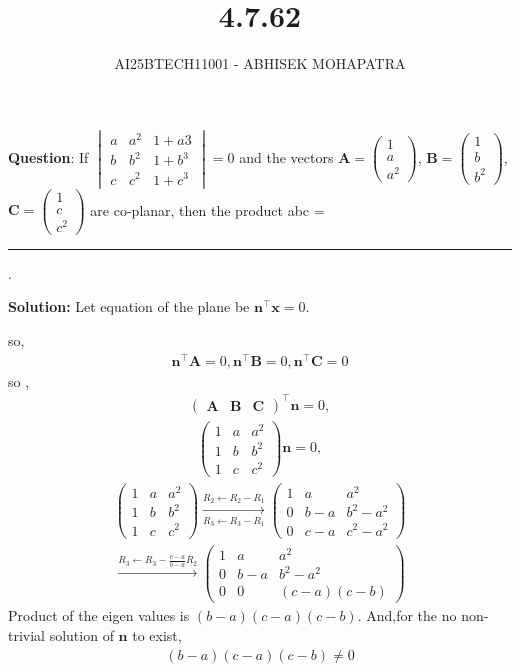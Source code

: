 \documentclass{beamer}
\title{4.7.62}
\author{AI25BTECH11001 - ABHISEK MOHAPATRA}
\theoremstyle{remark}
\newcommand{\myvec}[1]{\ensuremath{\begin{pmatrix}#1\end{pmatrix}}}
\newcommand{\mydet}[1]{\ensuremath{\begin{vmatrix}#1\end{vmatrix}}}
\let\vec\mathbf
\numberwithin{equation}{section}
\begin{document}
{\let\newpage\relax\maketitle}
\renewcommand{\thefigure}{\theenumi}
\renewcommand{\thetable}{\theenumi}



	 	\textbf{Question}:
If $\mydet{a &a^2 &1+ a3\\ b & b^2 & 1 + b^3\\c & c^2 & 1 + c^3} = 0$
and the vectors $\vec{A}=\myvec{1\\a\\a^2}$, $\vec{B}=\myvec{1\\b\\b^2}$, $\vec{C}=\myvec{1\\c\\c^2}$ are co-planar, then the product
abc = \rule{1cm}{0.15mm}.
		

		\textbf{Solution:} 
Let equation of the plane be $\vec{n}^\top\vec{x}=0$.

so, 
\begin{align}
\vec{n}^\top\vec{A}=0,
\vec{n}^\top\vec{B}=0,
\vec{n}^\top\vec{C}=0
\end{align}
so ,
\begin{align}
		\myvec{\vec{A}&\vec{B}&\vec{C}}^\top\vec{n}=0,
\end{align}
\begin{align}
		\myvec{1 & a &a^2\\1&b&b^2\\1&c&c^2}\vec{n}=0,
\end{align}
\begin{align}
		\myvec{1&a &a^2 \\1& b & b^2 \\1& c & c^2}	\xrightarrow[R_3\leftarrow R_3-R_1]{R_2\leftarrow R_2-R_1}\myvec{1&a &a^2 \\0& b-a & b^2-a^2 \\0& c-a & c^2-a^2}
\end{align}
\begin{align}
		\xrightarrow[]{R_3\leftarrow R_3-\frac{c-a}{b-a}R_2}\myvec{1&a &a^2 \\0& b-a & b^2-a^2 \\0&0 & (c-a)(c-b)}
\end{align}
Product of the eigen values is $(b-a)(c-a)(c-b)$. And,for the no non-trivial solution of $\vec{n}$ to exist, 
\begin{align}
(b-a)(c-a)(c-b) \neq 0 
\end{align}
\end{document}
